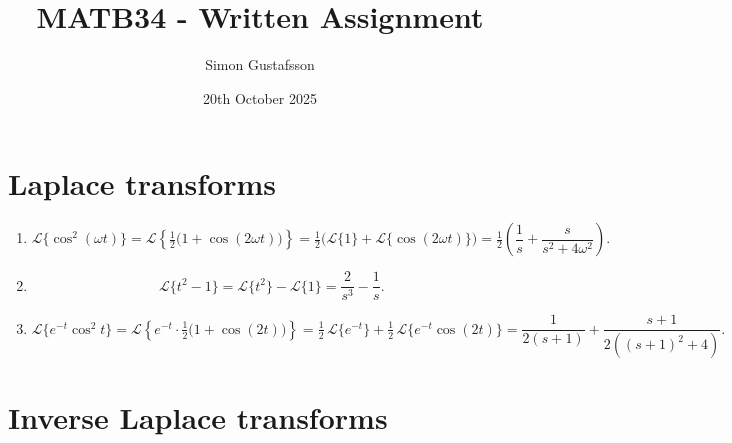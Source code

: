 \documentclass[11pt]{article}
\title{MATB34 - Written Assignment}
\author{Simon Gustafsson}
\date{20th October 2025}
\begin{document}
\maketitle

\section{Laplace transforms}

\begin{enumerate}[label=(\arabic*)]

\item
\[
\mathcal{L}\{\cos^2(\omega t)\} 
= \mathcal{L}\!\left\{\tfrac12\bigl(1+\cos(2\omega t)\bigr)\right\}
= \tfrac12\bigl(\mathcal{L}\{1\}+\mathcal{L}\{\cos(2\omega t)\}\bigr)
= \tfrac12\left(\frac{1}{s}+\frac{s}{s^{2}+4\omega^{2}}\right).
\]

\item
\[
\mathcal{L}\{t^2-1\}
= \mathcal{L}\{t^2\}-\mathcal{L}\{1\}
= \frac{2}{s^{3}}-\frac{1}{s}.
\]

\item
\[
\mathcal{L}\{e^{-t}\cos^{2}t\}
= \mathcal{L}\!\left\{e^{-t}\cdot \tfrac12\bigl(1+\cos(2t)\bigr)\right\}
= \tfrac12\,\mathcal{L}\{e^{-t}\}+\tfrac12\,\mathcal{L}\{e^{-t}\cos(2t)\}
= \frac{1}{2(s+1)}+\frac{s+1}{2((s+1)^{2}+4)}.
\]

\end{enumerate}

\section{Inverse Laplace transforms}
\end{document}
